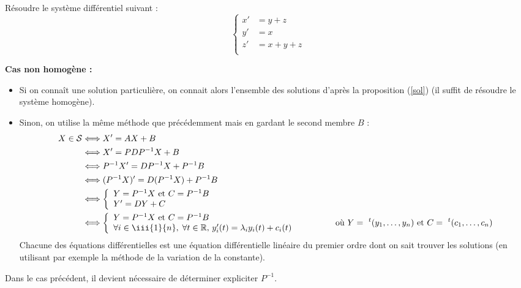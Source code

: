 \documentclass[french,11pt,twoside]{VcCours}
\begin{document}
\begin{ApplicationDirecte} Résoudre le système différentiel suivant :
$$ \left\lbrace \begin{array}{lll}
     x'&=y+z \\
    y' & =x \\
     z'&=x+y+z \\
    \end{array}\right.$$

\end{ApplicationDirecte}
\medskip

\textbf{Cas non homogène :} 
\begin{itemize}
\item Si on connaît une solution particulière, on connait alors l'ensemble des solutions d'après la proposition (\ref{sol}) (il suffit de résoudre le système homogène).
\item Sinon, on utilise la même méthode que précédemment mais en gardant le second membre $B$ :
\begin{align*}
X \in \mathcal{S} & \Longleftrightarrow  X'=AX+B \\
& \Longleftrightarrow X'=PDP^{-1} X+B\\
& \Longleftrightarrow P^{-1}X'=DP^{-1}X + P^{-1}B\\
& \Longleftrightarrow (P^{-1}X)'=D(P^{-1}X) + P^{-1}B \\
& \Longleftrightarrow \left\lbrace \begin{array}{l}
Y=P^{-1}X \hbox{ et }  C=P^{-1}B\\
Y'=DY+C \\
\end{array}\right. \\
& \Longleftrightarrow \left\lbrace \begin{array}{l}
Y=P^{-1}X \hbox{ et }  C=P^{-1}B\\
\forall i \in \iii{1}{n}, \; \forall t \in  \mathbb{R}, \, y_i'(t)=\lambda_i y_i(t) + c_i(t)  \\
\end{array}\right. \qquad \qquad \hbox{ où } Y= ~^t(y_1, \ldots, y_n) \hbox{ et } C= ~^t(c_1, \ldots, c_n)
\end{align*}
Chacune des équations différentielles est une équation différentielle linéaire du premier ordre dont on sait trouver les solutions (en utilisant par exemple la méthode de la variation de la constante).
\end{itemize}

\begin{Remarque}{} Dans le cas précédent, il devient nécessaire de déterminer expliciter $P^{-1}$.
\end{Remarque}
\medskip
\end{document}
